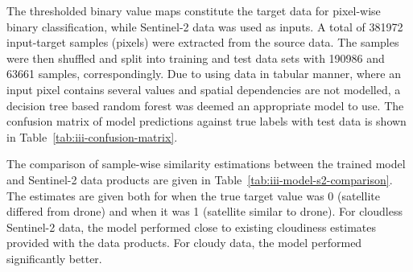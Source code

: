 The thresholded binary value maps constitute the target data for pixel-wise binary classification, while Sentinel-2 data was used as inputs. A total of 381972 input-target samples (pixels) were extracted from the source data. The samples were then shuffled and split into training and test data sets with 190986 and 63661 samples, correspondingly. Due to using data in tabular manner, where an input pixel contains several values and spatial dependencies are not modelled, a decision tree based random forest was deemed an appropriate model to use. The confusion matrix of model predictions against true labels with test data is shown in Table~\ref{tab:iii-confusion-matrix}.

The comparison of sample-wise similarity estimations between the trained model and Sentinel-2 data products are given in Table~\ref{tab:iii-model-s2-comparison}. The estimates are given both for when the true target value was 0 (satellite differed from drone) and when it was 1 (satellite similar to drone). For cloudless Sentinel-2 data, the model performed close to existing cloudiness estimates provided with the data products. For cloudy data, the model performed significantly better.

